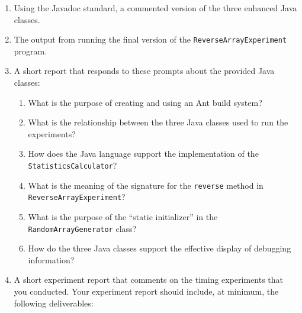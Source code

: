 \vspace*{-.05in}
\begin{enumerate}

  \itemsep 0em
  \item Using the Javadoc standard, a commented version of the three enhanced Java classes.

  \item The output from running the final version of the {\tt ReverseArrayExperiment} program.

  \item A short report that responds to these prompts about the provided Java classes:

    \vspace*{-.05in}
    \begin{enumerate}
      \itemsep 0em

      \item What is the purpose of creating and using an Ant build system?

      \item What is the relationship between the three Java classes used to run the experiments?

      \item How does the Java language support the implementation of the {\tt StatisticsCalculator}?

      \item What is the meaning of the signature for the {\tt reverse} method in {\tt ReverseArrayExperiment}?

      \item What is the purpose of the ``static initializer'' in the {\tt RandomArrayGenerator} class?

      \item How do the three Java classes support the effective display of debugging information?

    \end{enumerate}

  \item A short experiment report that comments on the timing experiments that you conducted. Your experiment report
    should include, at minimum, the following deliverables:


\end{enumerate}
